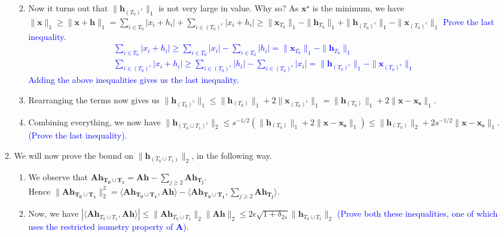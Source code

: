 \documentclass[11pt]{article}
\begin{document}
\begin{enumerate}
\begin{enumerate}
\begin{enumerate}
{}
\item Now it turns out that $\|\mathbf{h}_{(T_0)^c}\|_1$ is not very large in value. Why so? As $\mathbf{x}^{\star}$ is the minimum, we have $\|\mathbf{x}\|_1 \geq \|\mathbf{x}+\mathbf{h}\|_1 = \sum_{i \in T_0} |x_i + h_i| + \sum_{i \in {(T_0)}^c} |x_i + h_i| \geq \|\mathbf{x}_{T_0}\|_1 - \|\mathbf{h}_{T_0}\|_1 + \|\mathbf{h}_{{(T_0)}^c}\|_1 - \|\mathbf{x}_{{(T_0)^c}}\|_1$ \textcolor{blue}{Prove the last inequality}. \\
\textcolor{blue}{
\begin{gather*}
\sum_{i \in T_0} |x_i + h_i| \geq \sum_{i \in T_0}|x_i| - \sum_{i \in T_0}|h_i| = \|\mathbf{x}_{T_0}\|_1 - \|\mathbf{h}_{T_0}\|_1\\
\sum_{i \in {(T_0)}^c} |x_i + h_i| \geq \sum_{i \in {(T_0)}^c}|h_i| - \sum_{i \in {(T_0)}^c}|x_i| = \|\mathbf{h}_{{(T_0)}^c}\|_1 - \|\mathbf{x}_{{(T_0)^c}}\|_1
\end{gather*}
Adding the above inequalities gives us the last inequality.
}
\item Rearranging the terms now gives us $\|\mathbf{h}_{{(T_0)}^c}\|_1 \leq \|\mathbf{h}_{{(T_0)}}\|_1  + 2\|\mathbf{x}_{{(T_0)^c}}\|_1 = \|\mathbf{h}_{{(T_0)}}\|_1  + 2\|\mathbf{x}-\mathbf{x_s}\|_1$. 
\item Combining everything, we now have $\|\mathbf{h}_{(T_0 \cup T_1)^c}\|_2 \leq s^{-1/2}(\|\mathbf{h}_{{(T_0)}}\|_1  + 2\|\mathbf{x}-\mathbf{x_s}\|_1) \leq \|\mathbf{h}_{{(T_0)}}\|_2 + 2s^{-1/2} \|\mathbf{x}-\mathbf{x_s}\|_1$. \textcolor{blue}{(Prove the last inequality).}
\end{enumerate}
\item We will now prove the bound on $\|\mathbf{h}_{(T_0 \cup T_1)}\|_2$, in the following way. 
\begin{enumerate}
\item We observe that $\mathbf{Ah_{T_0 \cup T_1}} = \mathbf{Ah} - \sum_{j \geq 2} \mathbf{Ah_{T_j}}$. \\
Hence $\|\mathbf{Ah_{T_0 \cup T_1}}\|^2_2 = \langle \mathbf{Ah_{T_0 \cup T_1}} , \mathbf{Ah}\rangle - \langle \mathbf{Ah_{T_0 \cup T_1}} , \sum_{j \geq 2} \mathbf{Ah_{T_j}}\rangle$.
\item Now, we have $|\langle \mathbf{Ah}_{T_0 \cup T_1} , \mathbf{Ah}\rangle| \leq \|\mathbf{Ah}_{T_0 \cup T_1}\|_2 \|\mathbf{Ah}\|_2 \leq 2 \epsilon \sqrt{1 + \delta_{2s}} \|\mathbf{h}_{T_0 \cup T_1}\|_2$ \textcolor{blue}{(Prove both these inequalities, one of which uses the restricted isometry property of $\mathbf{A}$)}. \\

\end{enumerate}
\end{enumerate}
\end{enumerate}
\end{document}
